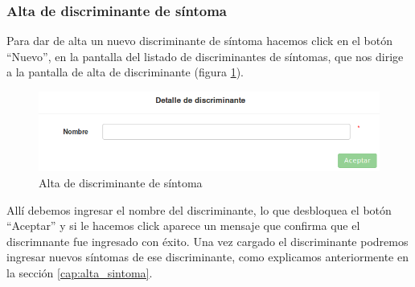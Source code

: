 \subsubsection{Alta de discriminante de síntoma}\label{cap:alta_discriminante}
Para dar de alta un nuevo discriminante de síntoma hacemos click en el botón ``Nuevo'', en la pantalla del listado de discriminantes de síntomas, que nos dirige a la pantalla de alta de discriminante (figura \ref{fig:nuevo_discriminante}).
\begin{figure}
\centerline{\includegraphics[width=1\textwidth]{nuevo_discriminante.png}}
\caption{Alta de discriminante de síntoma}
\label{fig:nuevo_discriminante}
\end{figure}
Allí debemos ingresar el nombre del discriminante, lo que desbloquea el botón ``Aceptar'' y si le hacemos click aparece un mensaje que confirma que el discrimnante fue ingresado con éxito. Una vez cargado el discriminante podremos ingresar nuevos síntomas de ese discriminante, como explicamos anteriormente en la sección \ref{cap:alta_sintoma}.

